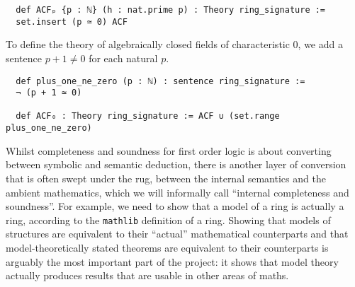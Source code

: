 \begin{dfn}
  \begin{lstlisting}
  def ACFₚ {p : ℕ} (h : nat.prime p) : Theory ring_signature :=
  set.insert (p ≃ 0) ACF\end{lstlisting}

  To define the theory of algebraically closed fields of characteristic $0$,
  we add a sentence $p + 1 \ne 0$ for each natural $p$.

  \begin{lstlisting}
  def plus_one_ne_zero (p : ℕ) : sentence ring_signature :=
  ¬ (p + 1 ≃ 0)

  def ACF₀ : Theory ring_signature := ACF ∪ (set.range plus_one_ne_zero)  \end{lstlisting}

\end{dfn}

  Whilst completeness and soundness for first order logic
  is about converting between symbolic and semantic deduction,
  there is another layer of conversion that is often swept under the rug,
  between the internal semantics and the ambient mathematics,
  which we will informally call ``internal completeness and soundness''.
  For example, we need to show that a model of a ring is
  actually a ring, according to the \texttt{mathlib} definition of a ring.
  Showing that models of structures are equivalent to their ``actual'' mathematical counterparts
  and that model-theoretically stated theorems are equivalent to
  their counterparts is arguably the most important part of the project:
  it shows that model theory actually produces results that are usable
  in other areas of maths.




